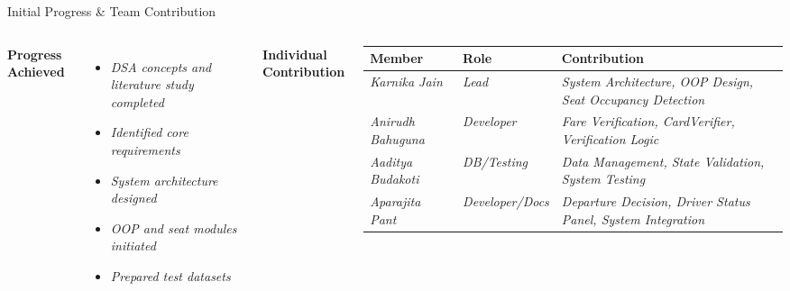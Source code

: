 \documentclass[aspectratio=169,11pt]{beamer}
\newcommand{\placeholder}[1]{\textit{\color{GEUGrey}#1}}
\begin{document}
\begin{frame}{Initial Progress \& Team Contribution}
\begin{columns}[T,totalwidth=\textwidth]
\textbf{\color{GEUBlue}Progress Achieved}
\begin{itemize}\itemsep3pt
\item \placeholder{DSA concepts and literature study completed}
\item \placeholder{Identified core requirements}
\item \placeholder{System architecture designed}
\item \placeholder{OOP and seat modules initiated}
\item \placeholder{Prepared test datasets}
\end{itemize}
\textbf{\color{GEUBlue}Individual Contribution}
\vspace{2mm}
\scriptsize
\begin{tabularx}{\textwidth}{@{}p{1.8cm}|p{2.0cm}|X@{}}
\toprule
Member & Role & Contribution\\
\midrule
\placeholder{Karnika Jain} & \placeholder{Lead} & \placeholder{System Architecture, OOP Design, Seat Occupancy Detection}\\
\hline
\placeholder{Anirudh Bahuguna} & \placeholder{Developer} & \placeholder{Fare Verification, CardVerifier, Verification Logic}\\
\hline
\parbox[t]{1.8cm}{\placeholder{Aaditya}\\[-1pt]\placeholder{Budakoti}}
&
\parbox[t]{2.0cm}{\placeholder{DB/Testing}}
&
\placeholder{Data Management, State Validation, System Testing}\\
\hline
\placeholder{Aparajita Pant} & \placeholder{Developer/Docs} & \placeholder{Departure Decision, Driver Status Panel, System Integration}\\
\bottomrule
\end{tabularx}
\end{columns}
\end{frame}
\end{document}
